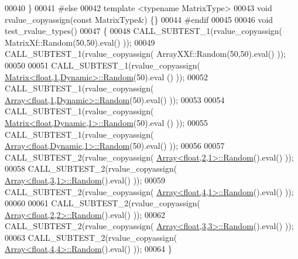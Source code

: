 \begin{DoxyCode}
00040 \}
00041 \textcolor{preprocessor}{#else}
00042 \textcolor{keyword}{template} <\textcolor{keyword}{typename} MatrixType>
00043 \textcolor{keywordtype}{void} rvalue\_copyassign(\textcolor{keyword}{const} MatrixType&) \{\}
00044 \textcolor{preprocessor}{#endif}
00045 
00046 \textcolor{keywordtype}{void} test\_rvalue\_types()
00047 \{
00048   CALL\_SUBTEST\_1(rvalue\_copyassign( MatrixXf::Random(50,50).eval() ));
00049   CALL\_SUBTEST\_1(rvalue\_copyassign( ArrayXXf::Random(50,50).eval() ));
00050 
00051   CALL\_SUBTEST\_1(rvalue\_copyassign( \hyperlink{group___core___module_class_eigen_1_1_matrix}{Matrix<float,1,Dynamic>::Random}(50).eval
      () ));
00052   CALL\_SUBTEST\_1(rvalue\_copyassign( \hyperlink{group___core___module_class_eigen_1_1_array}{Array<float,1,Dynamic>::Random}(50).eval()
       ));
00053 
00054   CALL\_SUBTEST\_1(rvalue\_copyassign( \hyperlink{group___core___module_class_eigen_1_1_matrix}{Matrix<float,Dynamic,1>::Random}(50).eval
      () ));
00055   CALL\_SUBTEST\_1(rvalue\_copyassign( \hyperlink{group___core___module_class_eigen_1_1_array}{Array<float,Dynamic,1>::Random}(50).eval()
       ));
00056   
00057   CALL\_SUBTEST\_2(rvalue\_copyassign( \hyperlink{group___core___module_class_eigen_1_1_array}{Array<float,2,1>::Random}().eval() ));
00058   CALL\_SUBTEST\_2(rvalue\_copyassign( \hyperlink{group___core___module_class_eigen_1_1_array}{Array<float,3,1>::Random}().eval() ));
00059   CALL\_SUBTEST\_2(rvalue\_copyassign( \hyperlink{group___core___module_class_eigen_1_1_array}{Array<float,4,1>::Random}().eval() ));
00060 
00061   CALL\_SUBTEST\_2(rvalue\_copyassign( \hyperlink{group___core___module_class_eigen_1_1_array}{Array<float,2,2>::Random}().eval() ));
00062   CALL\_SUBTEST\_2(rvalue\_copyassign( \hyperlink{group___core___module_class_eigen_1_1_array}{Array<float,3,3>::Random}().eval() ));
00063   CALL\_SUBTEST\_2(rvalue\_copyassign( \hyperlink{group___core___module_class_eigen_1_1_array}{Array<float,4,4>::Random}().eval() ));
00064 \}
\end{DoxyCode}
